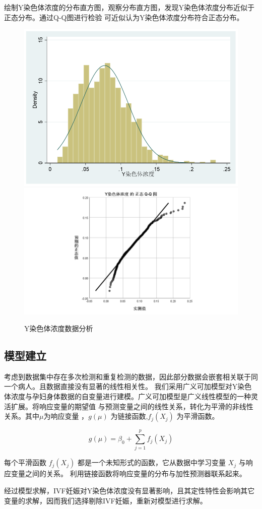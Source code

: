 \documentclass[withoutpreface,notoc]{cumcmthesis}
\begin{document}
	绘制Y染色体浓度的分布直方图，观察分布直方图，发现Y染色体浓度分布近似于正态分布。通过Q-Q图进行检验
	可近似认为Y染色体浓度分布符合正态分布。
	\begin{figure}[ht]
		\centering
		{\includegraphics[width=.45\textwidth]{figures/Y染色体浓度分布.png}}
		\hfill %
		{\includegraphics[width=.45\textwidth]{figures/Y染色体浓度正态.png}}
		\caption{Y染色体浓度数据分析}
		\label{fig:Y染色体浓度}
	\end{figure}


	\subsection{模型建立}
	考虑到数据集中存在多次检测和重复检测的数据，因此部分数据会嵌套相关联于同一个病人。且数据直接没有显著的线性相关性。
	我们采用广义可加模型对Y染色体浓度与孕妇身体数据的自变量进行建模。广义可加模型是广义线性模型的一种灵活扩展。将响应变量的期望值
	与预测变量之间的线性关系，转化为平滑的非线性关系。其中$\mu $为响应变量 ，$g(\mu)$ 为链接函数,$f_{j}(X_{j})$ 为平滑函数。

	\begin{equation}
	g(\mu) = \beta_0 + \sum_{j=1}^{p} f_{j}(X_{j})
	\end{equation}


	每个平滑函数 $f_{j}(X_{j})$ 都是一个未知形式的函数，它从数据中学习变量 $X_{j}$ 与响应变量之间的关系。
	利用链接函数将响应变量的分布与加性预测器联系起来。

	经过模型求解，IVF妊娠对Y染色体浓度没有显著影响，且其定性特性会影响其它变量的求解，因而我们选择剔除IVF妊娠，重新对模型进行求解。
\end{document}
